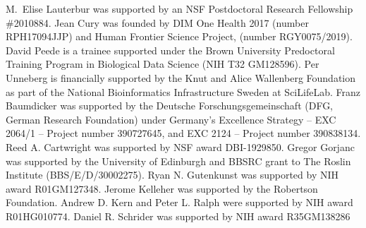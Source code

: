 \documentclass[hidelinks]{article}
\begin{document}
M.~Elise Lauterbur was supported by an NSF Postdoctoral Research Fellowship \#2010884.
Jean Cury was founded by DIM One Health 2017 (number RPH17094JJP) and Human Frontier Science Project, (number RGY0075/2019).
David Peede is a trainee supported under the Brown University Predoctoral Training Program in Biological Data Science (NIH T32 GM128596).
Per Unneberg is financially supported by the Knut and Alice Wallenberg
Foundation as part of the National Bioinformatics Infrastructure Sweden
at SciLifeLab.
Franz Baumdicker was supported by the Deutsche Forschungsgemeinschaft (DFG, German Research Foundation) under Germany’s Excellence Strategy – EXC 2064/1 – Project number 390727645, and EXC 2124 – Project number 390838134.
Reed A. Cartwright was supported by NSF award DBI-1929850.
Gregor Gorjanc was supported by the University of Edinburgh and BBSRC grant to The Roslin Institute (BBS/E/D/30002275).
Ryan N. Gutenkunst was supported by NIH award R01GM127348.
Jerome Kelleher was supported by the Robertson Foundation.
Andrew D. Kern and Peter L. Ralph were supported by NIH award R01HG010774.
Daniel R. Schrider was supported by NIH award R35GM138286


\end{document}
